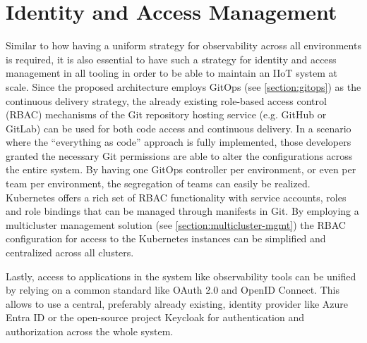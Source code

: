 \section{Identity and Access Management}
\label{section:iam}
    Similar to how having a uniform strategy for observability across all environments is required, it is also essential to have such a strategy for identity and access management in all tooling in order to be able to maintain an IIoT system at scale. Since the proposed architecture employs GitOps (see \autoref{section:gitops}) as the continuous delivery strategy, the already existing role-based access control (RBAC) mechanisms of the Git repository hosting service (e.g. GitHub or GitLab) can be used for both code access and continuous delivery. In a scenario where the ``everything as code'' approach is fully implemented, those developers granted the necessary Git permissions are able to alter the configurations across the entire system. By having one GitOps controller per environment, or even per team per environment, the segregation of teams can easily be realized. Kubernetes offers a rich set of RBAC functionality with service accounts, roles and role bindings that can be managed through manifests in Git. By employing a multicluster management solution (see \autoref{section:multicluster-mgmt}) the RBAC configuration for access to the Kubernetes instances can be simplified and centralized across all clusters. 

    Lastly, access to applications in the system like observability tools can be unified by relying on a common standard like OAuth 2.0 and OpenID Connect. This allows to use a central, preferably already existing, identity provider like Azure Entra ID or the open-source project Keycloak for authentication and authorization across the whole system. 
